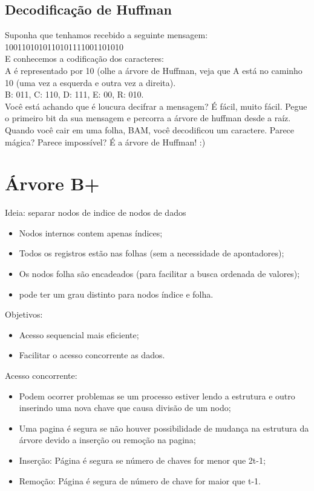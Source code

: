 \documentclass{article}
\begin{document}
\subsection{Decodificação de Huffman}
Suponha que tenhamos recebido a seguinte mensagem:\\
1001101010110101111001101010\\

E conhecemos a codificação dos caracteres:\\
A é representado por 10 (olhe a árvore de Huffman, veja que A está no caminho 10 (uma vez a esquerda
e outra vez a direita).\\
B: 011, C: 110, D: 111, E: 00, R: 010.\\

Você está achando que é loucura decifrar a mensagem? É fácil, muito fácil. Pegue o primeiro bit da
sua mensagem e percorra a árvore de huffman desde a raíz. Quando você cair em uma folha, BAM, você
decodificou um caractere. Parece mágica? Parece impossível? É a árvore de Huffman! :)

\newpage

\section{Árvore B+}

Ideia: separar nodos de indice de nodos de dados

\begin{itemize}
   \item Nodos internos contem apenas índices;
   \item Todos os registros estão nas folhas (sem a necessidade de apontadores);
   \item Os nodos folha são encadeados (para facilitar a busca ordenada de valores);
   \item pode ter um grau distinto para nodos índice e folha.
\end{itemize}

Objetivos:

\begin{itemize}
   \item Acesso sequencial mais eficiente;
   \item Facilitar o acesso concorrente as dados.
\end{itemize}

Acesso concorrente:

\begin{itemize}
   \item Podem ocorrer problemas se um processo estiver lendo a estrutura e outro inserindo uma nova
chave que causa divisão de um nodo;
   \item Uma pagina é segura se não houver possibilidade de mudança na estrutura da árvore devido a
inserção ou remoção na pagina;
   \item Inserção: Página é segura se número de chaves for menor que 2t-1;
   \item Remoção: Página é segura de número de chave for maior que t-1.
\end{itemize}
\end{document}
